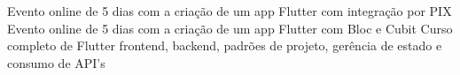 \documentclass[
    10pt,
    english,
]{article}
\begin{document}
{}
{Evento online de 5 dias com a criação de um app Flutter com integração por PIX}
{Evento online de 5 dias com a criação de um app Flutter com Bloc e Cubit}
{Curso completo de Flutter frontend, backend, padrões de projeto, gerência de estado e consumo de API's}
\end{document}
